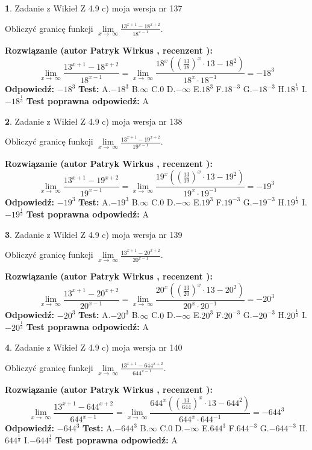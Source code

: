 \documentclass[12pt, a4paper]{article}
\theoremstyle{definition} %
\newtheorem{zad}{}
\newcommand{\zadStart}[1]{\begin{zad}#1\newline}
\newcommand{\zadStop}{\end{zad}}
\newcommand{\rozwStart}[2]{\noindent \textbf{Rozwiązanie (autor #1 , recenzent #2): }\newline}
\newcommand{\rozwStop}{\newline}
\newcommand{\odpStart}{\noindent \textbf{Odpowiedź:}\newline}
\newcommand{\odpStop}{\newline}
\newcommand{\testStart}{\noindent \textbf{Test:}\newline}
\newcommand{\testStop}{\newline}
\newcommand{\kluczStart}{\noindent \textbf{Test poprawna odpowiedź:}\newline}
\newcommand{\kluczStop}{\newline}
\begin{document}
\zadStart{Zadanie z Wikieł Z 4.9 c) moja wersja nr 137}


Obliczyć granicę funkcji  $\lim\limits_{x\to\ \infty}\frac{13^{x+1}-18^{x+2}}{18^{x-1}}$.
\zadStop
\rozwStart{Patryk Wirkus}{}
$$\lim\limits_{x\to\ \infty}\frac{13^{x+1}-18^{x+2}}{18^{x-1}}=\lim\limits_{x\to\ \infty}\frac{18^{x}((\frac{13}{18})^{x}\cdot 13 -18^{2})}{18^{x}\cdot 18^{-1}} = -18^{3}$$
\rozwStop
\odpStart
$-18^{3}$
\odpStop
\testStart
A.$-18^{3}$ B.$\infty$ C.$0$ D.$-\infty$ E.$18^{3}$
F.$18^{-3}$ G.$-18^{-3}$
H.$18^{\frac{1}{3}}$
I.$-18^{\frac{1}{3}}$
\testStop
\kluczStart
A
\kluczStop



\zadStart{Zadanie z Wikieł Z 4.9 c) moja wersja nr 138}


Obliczyć granicę funkcji  $\lim\limits_{x\to\ \infty}\frac{13^{x+1}-19^{x+2}}{19^{x-1}}$.
\zadStop
\rozwStart{Patryk Wirkus}{}
$$\lim\limits_{x\to\ \infty}\frac{13^{x+1}-19^{x+2}}{19^{x-1}}=\lim\limits_{x\to\ \infty}\frac{19^{x}((\frac{13}{19})^{x}\cdot 13 -19^{2})}{19^{x}\cdot 19^{-1}} = -19^{3}$$
\rozwStop
\odpStart
$-19^{3}$
\odpStop
\testStart
A.$-19^{3}$ B.$\infty$ C.$0$ D.$-\infty$ E.$19^{3}$
F.$19^{-3}$ G.$-19^{-3}$
H.$19^{\frac{1}{3}}$
I.$-19^{\frac{1}{3}}$
\testStop
\kluczStart
A
\kluczStop



\zadStart{Zadanie z Wikieł Z 4.9 c) moja wersja nr 139}


Obliczyć granicę funkcji  $\lim\limits_{x\to\ \infty}\frac{13^{x+1}-20^{x+2}}{20^{x-1}}$.
\zadStop
\rozwStart{Patryk Wirkus}{}
$$\lim\limits_{x\to\ \infty}\frac{13^{x+1}-20^{x+2}}{20^{x-1}}=\lim\limits_{x\to\ \infty}\frac{20^{x}((\frac{13}{20})^{x}\cdot 13 -20^{2})}{20^{x}\cdot 20^{-1}} = -20^{3}$$
\rozwStop
\odpStart
$-20^{3}$
\odpStop
\testStart
A.$-20^{3}$ B.$\infty$ C.$0$ D.$-\infty$ E.$20^{3}$
F.$20^{-3}$ G.$-20^{-3}$
H.$20^{\frac{1}{3}}$
I.$-20^{\frac{1}{3}}$
\testStop
\kluczStart
A
\kluczStop



\zadStart{Zadanie z Wikieł Z 4.9 c) moja wersja nr 140}


Obliczyć granicę funkcji  $\lim\limits_{x\to\ \infty}\frac{13^{x+1}-644^{x+2}}{644^{x-1}}$.
\zadStop
\rozwStart{Patryk Wirkus}{}
$$\lim\limits_{x\to\ \infty}\frac{13^{x+1}-644^{x+2}}{644^{x-1}}=\lim\limits_{x\to\ \infty}\frac{644^{x}((\frac{13}{644})^{x}\cdot 13 -644^{2})}{644^{x}\cdot 644^{-1}} = -644^{3}$$
\rozwStop
\odpStart
$-644^{3}$
\odpStop
\testStart
A.$-644^{3}$ B.$\infty$ C.$0$ D.$-\infty$ E.$644^{3}$
F.$644^{-3}$ G.$-644^{-3}$
H.$644^{\frac{1}{3}}$
I.$-644^{\frac{1}{3}}$
\testStop
\kluczStart
A
\kluczStop
\end{document}
